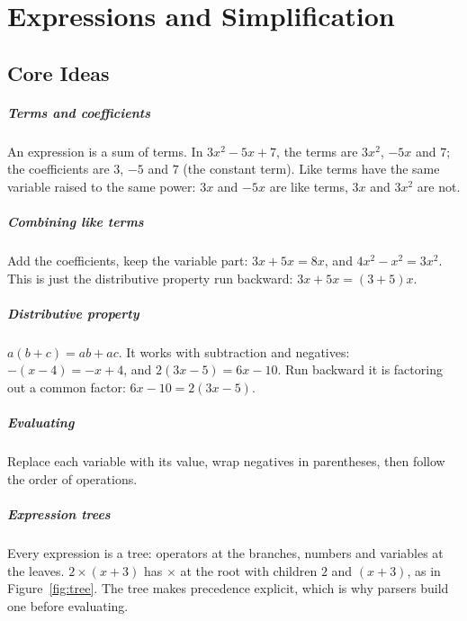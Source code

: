 \chapter{Expressions and Simplification}


\section{Core Ideas}

\paragraph{Terms and coefficients} An expression is a sum of terms. In $3x^2 - 5x + 7$, the terms are $3x^2$, $-5x$ and $7$; the coefficients are $3$, $-5$ and $7$ (the constant term). Like terms have the same variable raised to the same power: $3x$ and $-5x$ are like terms, $3x$ and $3x^2$ are not.

\paragraph{Combining like terms} Add the coefficients, keep the variable part: $3x + 5x = 8x$, and $4x^2 - x^2 = 3x^2$. This is just the distributive property run backward: $3x + 5x = (3 + 5)x$.

\paragraph{Distributive property} $a(b + c) = ab + ac$. It works with subtraction and negatives: $-(x - 4) = -x + 4$, and $2(3x - 5) = 6x - 10$. Run backward it is factoring out a common factor: $6x - 10 = 2(3x - 5)$.

\paragraph{Evaluating} Replace each variable with its value, wrap negatives in parentheses, then follow the order of operations.

\paragraph{Expression trees} Every expression is a tree: operators at the branches, numbers and variables at the leaves. $2 \times (x + 3)$ has $\times$ at the root with children $2$ and $(x + 3)$, as in Figure~\ref{fig:tree}. The tree makes precedence explicit, which is why parsers build one before evaluating.

